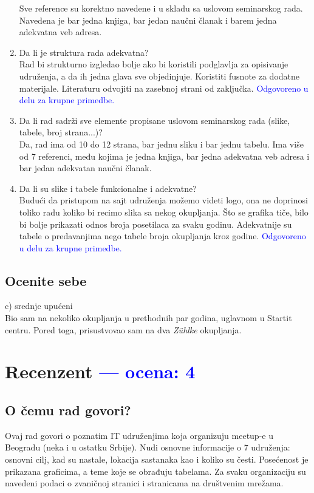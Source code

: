 \documentclass[a4paper]{report}
\newcommand{\odgovor}[1]{\textcolor{blue}{#1}}
\begin{document}
\begin{enumerate}
Sve reference su korektno navedene i u skladu sa uslovom seminarskog rada.
Navedena je bar jedna knjiga, bar jedan naučni članak i barem jedna adekvatna veb adresa.
\item Da li je struktura rada adekvatna?\\
Rad bi strukturno izgledao bolje ako bi koristili podglavlja za opisivanje udruženja,
a da ih jedna glava sve objedinjuje. Koristiti fusnote za dodatne materijale.
Literaturu odvojiti na zasebnoj strani od zaključka.
\odgovor{Odgovoreno u delu za krupne primedbe.}
\item Da li rad sadrži sve elemente propisane uslovom seminarskog rada (slike, tabele, broj strana...)?\\
Da, rad ima od 10 do 12 strana, bar jednu sliku i bar jednu tabelu. Ima više od 7 referenci,
među kojima je jedna knjiga, bar jedna adekvatna veb adresa i bar jedan adekvatan naučni članak.
\item Da li su slike i tabele funkcionalne i adekvatne?\\
Budući da pristupom na sajt udruženja možemo videti logo, ona ne doprinosi toliko radu koliko bi recimo
slika sa nekog okupljanja. Što se grafika tiče, bilo bi bolje prikazati odnos broja posetilaca za svaku 
godinu. Adekvatnije su tabele o predavanjima nego tabele broja okupljanja kroz godine.
\odgovor{Odgovoreno u delu za krupne primedbe.}
\end{enumerate}

\section{Ocenite sebe}
c) srednje upućeni\\
Bio sam na nekoliko okupljanja u prethodnih par godina, uglavnom
u Startit centru. Pored toga, prisustvovao sam na dva \textit{Zühlke} okupljanja.  


\chapter{Recenzent \odgovor{--- ocena: 4} }


\section{O čemu rad govori?}
Ovaj rad govori o poznatim IT udruženjima koja organizuju meetup-e u Beogradu (neka i u ostatku Srbije). Nudi osnovne informacije o 7 udruženja: osnovni cilj, kad su nastale, lokacija sastanaka kao i koliko su česti. Posećenost je prikazana graficima, a teme koje se obrađuju tabelama. Za svaku organizaciju su navedeni podaci o zvaničnoj stranici i stranicama na društvenim mrežama.
\end{document}
